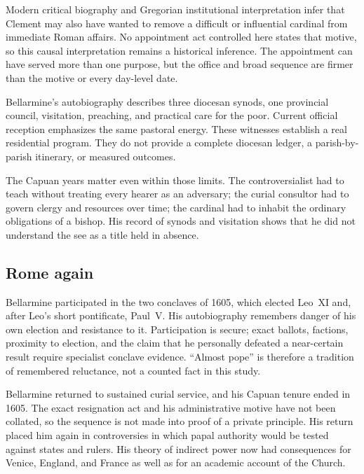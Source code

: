 Modern critical biography and Gregorian institutional interpretation infer
that Clement may also have wanted to remove a difficult or influential
cardinal from immediate Roman affairs.  No appointment act controlled here
states that motive, so this causal interpretation remains a historical
inference.  The appointment can have served more than one purpose,
but the office and broad sequence are firmer than the motive or every day-level
date.

Bellarmine's autobiography describes three diocesan synods, one provincial
council, visitation, preaching, and practical care for the poor.  Current
official reception emphasizes the same pastoral energy.  These witnesses
establish a real residential program.  They do not provide a complete diocesan
ledger, a parish-by-parish itinerary, or measured outcomes.

The Capuan years matter even within those limits.  The controversialist had to
teach without treating every hearer as an adversary; the curial consultor had
to govern clergy and resources over time; the cardinal had to inhabit the
ordinary obligations of a bishop.  His record of synods and visitation shows
that he did not understand the see as a title held in absence.

\subsection{Rome again}

Bellarmine participated in the two conclaves of 1605, which elected Leo~XI and,
after Leo's short pontificate, Paul~V.  His autobiography remembers danger of
his own election and resistance to it.  Participation is secure; exact ballots,
factions, proximity to election, and the claim that he personally defeated a
near-certain result require specialist conclave evidence.  ``Almost pope'' is
therefore a tradition of remembered reluctance, not a counted fact in this
study.

Bellarmine returned to sustained curial service, and his Capuan tenure ended
in 1605.  The exact resignation act and his administrative motive have not
been collated, so the sequence is not made into proof of a private principle.
His return placed him again in controversies in which papal authority would be
tested against states and rulers.  His theory of indirect power now had
consequences for Venice, England, and France as well as for an academic account
of the Church.

